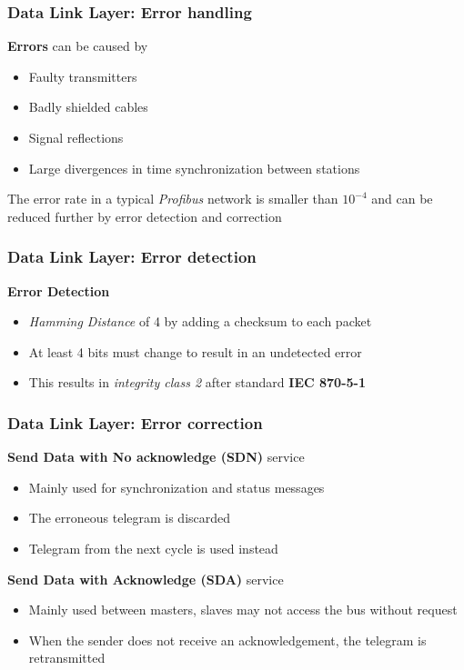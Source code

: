\documentclass{beamer}
\begin{document}
\begin{frame}
  \frametitle{Data Link Layer: Error handling}
  \textbf{Errors} can be caused by
  \begin{itemize}
    \item Faulty transmitters
    \item Badly shielded cables
    \item Signal reflections
    \item Large divergences in time synchronization between stations
  \end{itemize}
  \vspace{10pt}
  The error rate in a typical \textit{Profibus} network is smaller than $10^{-4}$ and can
  be reduced further by error detection and correction
\end{frame}

\begin{frame}
  \frametitle{Data Link Layer: Error detection}
  \textbf{Error Detection}
  \begin{itemize}
    \item \textit{Hamming Distance} of 4 by adding a checksum to each packet
    \item At least 4 bits must change to result in an undetected error
    \item This results in \textit{integrity class 2} after standard \textbf{IEC 870-5-1}
  \end{itemize}
\end{frame}

\begin{frame}
  \frametitle{Data Link Layer: Error correction}
  \textbf{Send Data with No acknowledge (SDN)} service
  \begin{itemize}
    \item Mainly used for synchronization and status messages
    \item The erroneous telegram is discarded
    \item Telegram from the next cycle is used instead
  \end{itemize}

  \vspace{10pt}
  \textbf{Send Data with Acknowledge (SDA)} service
  \begin{itemize}
    \item Mainly used between masters, slaves may not access the bus without request
    \item When the sender does not receive an acknowledgement, the telegram is
      retransmitted
  \end{itemize}
\end{frame}
\end{document}
